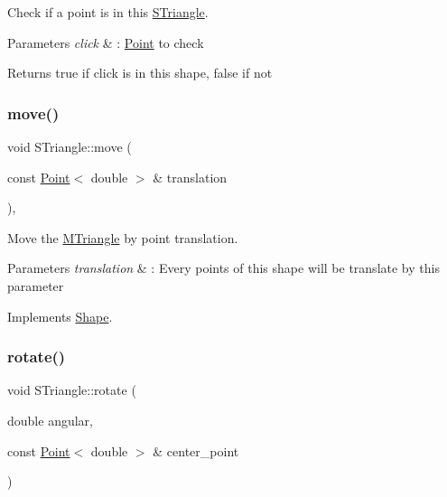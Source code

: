 Check if a point is in this \hyperlink{classSTriangle}{S\+Triangle}. 


\begin{DoxyParams}{Parameters}
{\em click} & \+: \hyperlink{classPoint}{Point} to check \\
\hline
\end{DoxyParams}
\begin{DoxyReturn}{Returns}
true if click is in this shape, false if not 
\end{DoxyReturn}
\mbox{\label{classSTriangle_ac72888032cde56407193da9435e2fcc0}} 
\subsubsection{\texorpdfstring{move()}{move()}}
{\footnotesize\ttfamily void S\+Triangle\+::move (\begin{DoxyParamCaption}\item[{const \hyperlink{classPoint}{Point}$<$ double $>$ \&}]{translation }\end{DoxyParamCaption})\hspace{0.3cm}{\ttfamily [override]}, {\ttfamily [virtual]}}



Move the \hyperlink{classMTriangle}{M\+Triangle} by point translation. 


\begin{DoxyParams}{Parameters}
{\em translation} & \+: Every points of this shape will be translate by this parameter \\
\hline
\end{DoxyParams}


Implements \hyperlink{classShape_a1f447acd6219cb10b9b7a40371519c46}{Shape}.

\mbox{\label{classSTriangle_a53b7f48c2bc66402170912686e77ec5d}} 
\subsubsection{\texorpdfstring{rotate()}{rotate()}}
{\footnotesize\ttfamily void S\+Triangle\+::rotate (\begin{DoxyParamCaption}\item[{double}]{angular,  }\item[{const \hyperlink{classPoint}{Point}$<$ double $>$ \&}]{center\+\_\+point }\end{DoxyParamCaption})}



